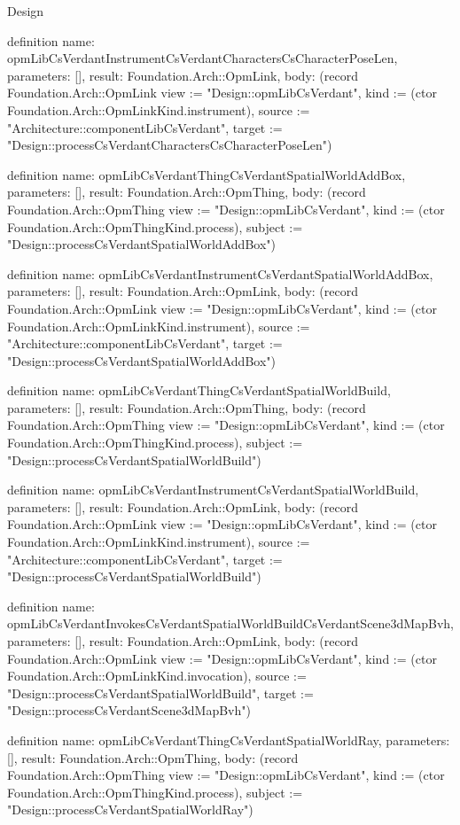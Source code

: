 \begin{lexlean}{Design}
\begin{semanticmodule}
definition{
  name: opmLibCsVerdantInstrumentCsVerdantCharactersCsCharacterPoseLen,
  parameters: [],
  result: Foundation.Arch::OpmLink,
  body: (record Foundation.Arch::OpmLink {view := "Design::opmLibCsVerdant", kind := (ctor Foundation.Arch::OpmLinkKind.instrument), source := "Architecture::componentLibCsVerdant", target := "Design::processCsVerdantCharactersCsCharacterPoseLen"})
}

definition{
  name: opmLibCsVerdantThingCsVerdantSpatialWorldAddBox,
  parameters: [],
  result: Foundation.Arch::OpmThing,
  body: (record Foundation.Arch::OpmThing {view := "Design::opmLibCsVerdant", kind := (ctor Foundation.Arch::OpmThingKind.process), subject := "Design::processCsVerdantSpatialWorldAddBox"})
}

definition{
  name: opmLibCsVerdantInstrumentCsVerdantSpatialWorldAddBox,
  parameters: [],
  result: Foundation.Arch::OpmLink,
  body: (record Foundation.Arch::OpmLink {view := "Design::opmLibCsVerdant", kind := (ctor Foundation.Arch::OpmLinkKind.instrument), source := "Architecture::componentLibCsVerdant", target := "Design::processCsVerdantSpatialWorldAddBox"})
}

definition{
  name: opmLibCsVerdantThingCsVerdantSpatialWorldBuild,
  parameters: [],
  result: Foundation.Arch::OpmThing,
  body: (record Foundation.Arch::OpmThing {view := "Design::opmLibCsVerdant", kind := (ctor Foundation.Arch::OpmThingKind.process), subject := "Design::processCsVerdantSpatialWorldBuild"})
}

definition{
  name: opmLibCsVerdantInstrumentCsVerdantSpatialWorldBuild,
  parameters: [],
  result: Foundation.Arch::OpmLink,
  body: (record Foundation.Arch::OpmLink {view := "Design::opmLibCsVerdant", kind := (ctor Foundation.Arch::OpmLinkKind.instrument), source := "Architecture::componentLibCsVerdant", target := "Design::processCsVerdantSpatialWorldBuild"})
}

definition{
  name: opmLibCsVerdantInvokesCsVerdantSpatialWorldBuildCsVerdantScene3dMapBvh,
  parameters: [],
  result: Foundation.Arch::OpmLink,
  body: (record Foundation.Arch::OpmLink {view := "Design::opmLibCsVerdant", kind := (ctor Foundation.Arch::OpmLinkKind.invocation), source := "Design::processCsVerdantSpatialWorldBuild", target := "Design::processCsVerdantScene3dMapBvh"})
}

definition{
  name: opmLibCsVerdantThingCsVerdantSpatialWorldRay,
  parameters: [],
  result: Foundation.Arch::OpmThing,
  body: (record Foundation.Arch::OpmThing {view := "Design::opmLibCsVerdant", kind := (ctor Foundation.Arch::OpmThingKind.process), subject := "Design::processCsVerdantSpatialWorldRay"})
}


\end{semanticmodule}
\end{lexlean}
